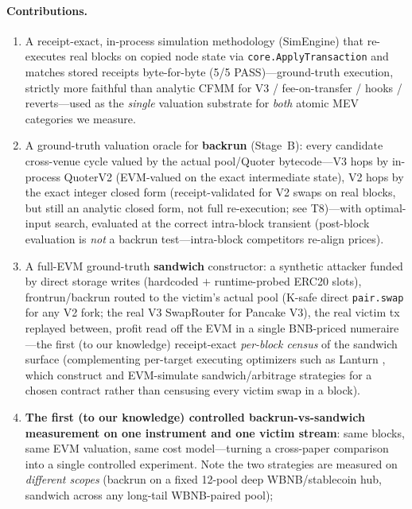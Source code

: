 \documentclass[11pt]{article}
\newcommand{\code}[1]{\texttt{#1}}
\begin{document}
\paragraph{Contributions.}
\begin{enumerate}
  \item A receipt-exact, in-process simulation methodology (SimEngine) that
    re-executes real blocks on copied node state via \code{core.ApplyTransaction}
    and matches stored receipts byte-for-byte (5/5 PASS)---ground-truth execution,
    strictly more faithful than analytic CFMM for V3 / fee-on-transfer / hooks /
    reverts---used as the \emph{single} valuation substrate for \emph{both} atomic
    MEV categories we measure.
  \item A ground-truth valuation oracle for \textbf{backrun} (Stage~B):
    every candidate cross-venue cycle valued by the actual pool/Quoter bytecode---V3
    hops by in-process QuoterV2 (EVM-valued on the exact intermediate state), V2 hops by
    the exact integer closed form (receipt-validated for V2 swaps on real blocks, but
    still an analytic closed form, not full re-execution; see T8)---with
    optimal-input search, evaluated at the correct intra-block transient (post-block
    evaluation is \emph{not} a backrun test---intra-block competitors re-align
    prices).
  \item A full-EVM ground-truth \textbf{sandwich} constructor: a synthetic attacker
    funded by direct storage writes (hardcoded $+$ runtime-probed ERC20 slots),
    frontrun/backrun routed to the victim's actual pool (K-safe direct
    \code{pair.swap} for any V2 fork; the real V3 SwapRouter for Pancake V3), the
    real victim tx replayed between, profit read off the EVM in a single BNB-priced
    numeraire---the first (to our knowledge) receipt-exact \emph{per-block census} of
    the sandwich surface (complementing per-target executing optimizers such as
    Lanturn \cite{babel2023lanturn}, which construct and EVM-simulate
    sandwich/arbitrage strategies for a chosen contract rather than censusing every
    victim swap in a block).
  \item \textbf{The first (to our knowledge) controlled backrun-vs-sandwich
    measurement on one instrument and one victim stream}: same blocks, same EVM
    valuation, same cost
    model---turning a cross-paper comparison into a single controlled experiment.
    Note the two strategies are measured on \emph{different scopes} (backrun on a fixed
    12-pool deep WBNB/stablecoin hub, sandwich across any long-tail WBNB-paired pool);

\end{enumerate}
\end{document}
